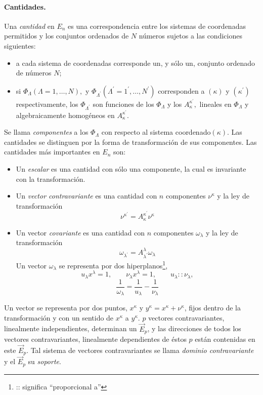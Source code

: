 \documentclass{article}
\theoremstyle{definition} \newtheorem{defi}{Definici\'on}
\theoremstyle{definition} \newtheorem{teo}{Teorema}
\theoremstyle{definition} \newtheorem{cor}{Corolario}
\begin{document}
\paragraph{Cantidades.}
Una \emph{cantidad} en $E_n$ es una correspondencia entre los sistemas de coordenadas permitidos y los conjuntos ordenados de $N$ n\'umeros sujetos a las condiciones siguientes:
\begin{itemize}
\item a cada sistema de coordenadas corresponde un, y s\'olo un, conjunto ordenado de n\'umeros $N$;
\item si $\Phi_{\Lambda} (\Lambda = 1, \dots ,N),$ y $\Phi_{\Lambda^{'}} (\Lambda^{'} = 1^{'}, \dots, N^{'})$ corresponden a $(\kappa)$ y $(\kappa^{'})$ respectivamente, los $\Phi_{\Lambda^{'}}$ son funciones de los $\Phi_{\Lambda}$ y los $A_{\kappa}^{\kappa^{'}},$ lineales en $\Phi_{\Lambda}$ y algebraicamente homog\'eneos en $A_{\kappa}^{\kappa^{'}}.$
\end{itemize}
Se llama \emph{componentes} a los $\Phi_{\Lambda}$ con respecto al sistema coordenado$(\kappa)$. Las cantidades se distinguen por la forma de transformaci\'on de sus componentes. Las cantidades m\'as importantes en $E_n$ son:

\begin{itemize}
\item Un \emph{escalar} es una cantidad con s\'olo una componente, la cual es invariante con la transformaci\'on.
\item Un \emph{vector contravariante} es una cantidad con $n$ componentes $\nu^{\kappa}$ y la ley de transformaci\'on
\begin{equation}
\nu^{\kappa^{'}}=A_{\kappa}^{\kappa^{'}}\nu^{\kappa}
\end{equation}
\item Un vector \emph{covariante} es una cantidad con $n$ componentes $\omega_{\lambda}$ y la ley de transformaci\'on
\begin{equation}
\omega_{\lambda^{'}}=A_{\lambda^{'}}^{\lambda}\omega_{\lambda}
\end{equation}
Un vector $\omega_{\lambda}$ se representa por dos hiperplanos\footnote{:: significa ``proporcional a''},
$$u_{\lambda}x^{\lambda}=1, \qquad \nu_{\lambda}x^{\lambda}=1, \qquad u_{\lambda}::\nu_{\lambda},$$
$$\frac{1}{\omega_{\lambda}}=\frac{1}{u_{\lambda}}-\frac{1}{\nu_{\lambda}}$$
\end{itemize}
Un vector se representa por dos puntos, $x^{\kappa}$ y $y^{\kappa}=x^{\kappa}+\nu^{\kappa}$, fijos dentro de la transformaci\'on y con un sentido de $x^{\kappa}$ a $y^{\kappa}$.
$p$ vectores contravariantes, linealmente independientes, determinan un $\vec{E}_p$, y las direcciones de todos los vectores contravariantes, linealmente dependientes de \'estos $p$ est\'an contenidas en este $\vec{E}_p$. Tal sistema de vectores contravariantes se llama \emph{dominio contravariante} y el $\vec{E}_p$ su \emph{soporte}.
\end{document}
